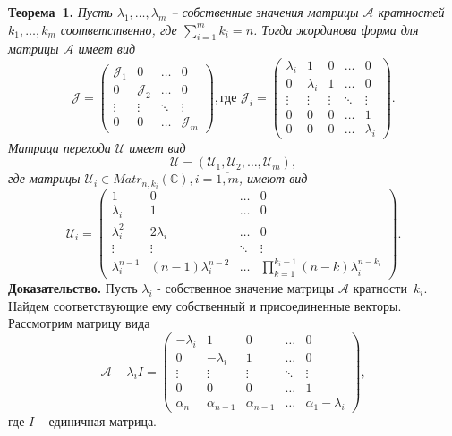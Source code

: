 \textbf{Теорема~1.}
{ \it Пусть $\lambda_1, \ldots , \lambda_m$ -- собственные значения матрицы $\mathcal{A}$ кратностей $k_1, \ldots , k_m$ соответственно, где $\sum\limits_{i=1}^m k_i = n$. Тогда жорданова форма для матрицы $\mathcal{A}$ имеет вид
$$
	\mathcal{J} = \begin{pmatrix}
		\mathcal{J}_1 & 0 & \dots & 0 \\
		0 & \mathcal{J}_2 & \dots & 0 \\
		\vdots & \vdots & \ddots & \vdots \\
		0 & 0 & \dots & \mathcal{J}_m
	\end{pmatrix}, {\text{где }}
	\mathcal{J}_i = \begin{pmatrix}
		\lambda_i & 1 & 0 & \dots & 0 \\
		0 & \lambda_i & 1 & \dots & 0 \\
		\vdots & \vdots & \vdots & \ddots & \vdots \\
		0 & 0 & 0 & \dots & 1 \\
		0 & 0 & 0 & \dots & \lambda_i
	\end{pmatrix}.
$$
Матрица перехода $\mathcal{U}$ имеет вид
$$
\mathcal{U} = \left( \mathcal{U}_1, \mathcal{U}_2, \dots, \mathcal{U}_m \right),
$$
где матрицы $\mathcal{U}_i \in Matr_{n,k_i} (\mathbb{C}) , i= \overline{1,m}$, имеют вид
$$
\mathcal{U}_i = \begin{pmatrix}
1 & 0 & \dots & 0 \\
\lambda_i & 1 & \dots & 0 \\ 
\lambda_i^2 & 2\lambda_i & \dots & 0 \\
\vdots & \vdots & \ddots & \vdots \\
\lambda_i^{n-1} & (n-1)\lambda_i^{n-2} & \dots & \prod_{k=1}^{k_i-1}(n-k)\lambda_i^{n-k_i}
\end{pmatrix}.
$$
}
\textbf{Доказательство.} Пусть $\lambda_i$ - собственное значение матрицы $\mathcal{A}$ кратности~$k_i$. Найдем соответствующие ему собственный и присоединенные векторы. Рассмотрим матрицу вида
$$
\mathcal{A}-\lambda_i I = 
\begin{pmatrix}
	-\lambda_i & 1 & 0 & \dots & 0 \\
	0 & -\lambda_i & 1 & \dots & 0 \\
	\vdots & \vdots & \vdots & \ddots & \vdots \\
	0 & 0 & 0 & \dots & 1 \\
	\alpha_n & \alpha_{n-1} & \alpha_{n-1} & \dots & \alpha_1-\lambda_i
\end{pmatrix},
$$ 
где $I$ -- единичная матрица.\\

